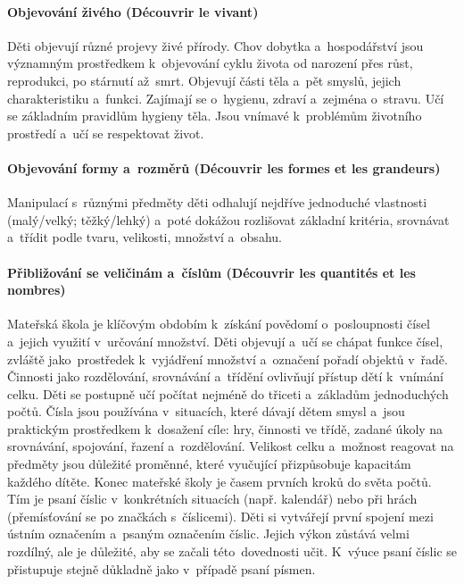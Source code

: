 			\paragraph{Objevování živého (Découvrir le vivant)} 
				Děti objevují různé projevy živé přírody. Chov dobytka a~hospodářství jsou významným prostředkem k objevování cyklu života od narození přes růst, reprodukci, po stárnutí až smrt.
				Objevují části těla a~pět smyslů, jejich charakteristiku a~funkci. Zajímají se o~hygienu, zdraví a~zejména o~stravu. Učí se základním pravidlům hygieny těla. 
				Jsou vnímavé k problémům životního prostředí a~učí se respektovat život. 
			\paragraph{Objevování formy a~rozměrů (Découvrir les formes et les grandeurs)}
				Manipulací s různými předměty děti odhalují nejdříve jednoduché vlastnosti (malý/velký; těžký/lehký) a~poté dokážou rozlišovat základní kritéria, srovnávat a~třídit podle tvaru, velikosti, množství a~obsahu.
			\paragraph{Přibližování se veličinám a~číslům (Découvrir les quantités et les nombres)}
				Mateřská škola je klíčovým obdobím k získání povědomí o~posloupnosti čísel a~jejich využití v určování množství. Děti objevují a~učí se chápat funkce čísel, zvláště jako prostředek k~vyjádření množství a~označení pořadí objektů v řadě.
				Činnosti jako rozdělování, srovnávání a~třídění ovlivňují přístup dětí k vnímání celku. Děti se postupně učí počítat nejméně do třiceti a~základům jednoduchých počtů.
				Čísla jsou používána v situacích, které dávají dětem smysl a~jsou praktickým prostředkem k dosažení cíle: hry, činnosti ve třídě, zadané úkoly na srovnávání, spojování, řazení a rozdělování. Velikost celku a~možnost reagovat na předměty jsou důležité proměnné, které vyučující přizpůsobuje kapacitám každého dítěte. 
				Konec mateřské školy je časem prvních kroků do světa počtů. 
				Tím je psaní číslic v konkrétních situacích (např. kalendář) nebo při hrách (přemísťování se po značkách s číslicemi). Děti si vytvářejí první spojení mezi ústním označením a~psaným označením číslic. Jejich výkon zůstává velmi rozdílný, ale je důležité, aby se začali této dovednosti učit. K výuce psaní číslic se přistupuje stejně důkladně jako v případě psaní písmen.
